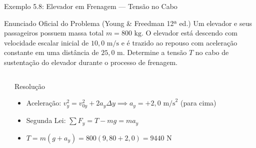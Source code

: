 \documentclass[10pt,aspectratio=169]{beamer}
\begin{document}
\begin{frame}{Exemplo 5.8: Elevador em Frenagem --- Tensão no Cabo}
    \begin{block}{Enunciado Oficial do Problema (Young \& Freedman 12ª ed.)}
        \small
        Um elevador e seus passageiros possuem massa total $m = 800\text{ kg}$. O elevador está descendo com velocidade escalar inicial de $10{,}0\text{ m/s}$ e é trazido ao repouso com aceleração constante em uma distância de $25{,}0\text{ m}$. Determine a tensão $T$ no cabo de sustentação do elevador durante o processo de frenagem.
    \end{block}
    \begin{columns}[T]
        \begin{center}
        \end{center}
        \begin{exampleblock}{Resolução}
            \small
            \begin{itemize}\setlength{\itemsep}{3pt}
                \item Aceleração: $v_y^2 = v_{0y}^2 + 2a_y \Delta y \implies a_y = +2{,}0\text{ m/s}^2$ (para cima)
                \item Segunda Lei: $\sum F_y = T - mg = m a_y$
                \item $T = m(g + a_y) = 800(9{,}80 + 2{,}0) = 9440\text{ N}$
            \end{itemize}
        \end{exampleblock}
    \end{columns}
\end{frame}
\end{document}
